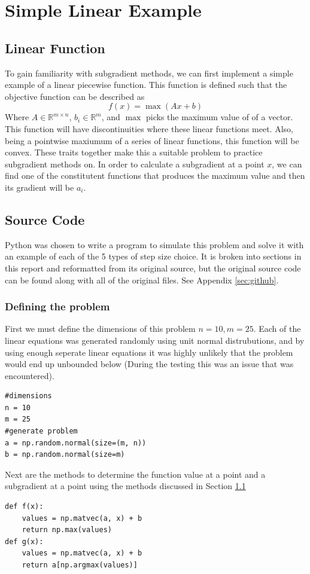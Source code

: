\documentclass[journal,onecolumn]{IEEEtran}
\begin{document}
\section{Simple Linear Example}\label{sec:linear example}
\subsection{Linear Function}\label{sec:linear math}
To gain familiarity with subgradient methods, we can first implement a simple example of a linear piecewise function. This function is defined such that the objective function can be described as
\begin{equation}\label{eq:linear example equation}
f(x) = \max(A x + b)
\end{equation}
Where \(A \in \mathbb{R}^{m \times n}\), \(b_i \in \mathbb{R}^m\), and \(\max\) picks the maximum value of of a vector. This function will have discontinuities where these linear functions meet. Also, being a pointwise maxiumum of a series of linear functions, this function will be convex. These traits together make this a suitable problem to practice subgradient methods on. In order to calculate a subgradient at a point \(x\), we can find one of the constitutent functions that produces the maximum value and then its gradient will be \(a_i\).
\subsection{Source Code}\label{sec:linear code}
Python was chosen to write a program to simulate this problem and solve it with an example of each of the 5 types of step size choice. It is broken into sections in this report and reformatted from its original source, but the original source code can be found along with all of the original files. See Appendix \ref{sec:github}.

\subsubsection{Defining the problem}
First we must define the dimensions of this problem \(n=10, m = 25\). Each of the linear equations was generated randomly using unit normal distrubutions, and by using enough seperate linear equations it was highly unlikely that the problem would end up unbounded below (During the testing this was an issue that was encountered).
\begin{verbatim}
#dimensions
n = 10
m = 25
#generate problem
a = np.random.normal(size=(m, n))
b = np.random.normal(size=m)
\end{verbatim}
Next are the methods to determine the function value at a point and a subgradient at a point using the methods discussed in Section \ref{sec:linear math}
\begin{verbatim}
def f(x):
    values = np.matvec(a, x) + b
    return np.max(values)
def g(x):
    values = np.matvec(a, x) + b
    return a[np.argmax(values)]
\end{verbatim}
\end{document}
